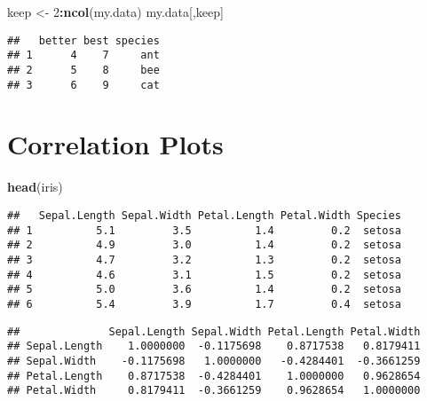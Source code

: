 \documentclass[]{book}
\newenvironment{Shaded}{\begin{snugshade}}{\end{snugshade}}
\newcommand{\DecValTok}[1]{\textcolor[rgb]{0.00,0.00,0.81}{#1}}
\newcommand{\KeywordTok}[1]{\textcolor[rgb]{0.13,0.29,0.53}{\textbf{#1}}}
\newcommand{\NormalTok}[1]{#1}
\newcommand{\OperatorTok}[1]{\textcolor[rgb]{0.81,0.36,0.00}{\textbf{#1}}}
\newcommand{\StringTok}[1]{\textcolor[rgb]{0.31,0.60,0.02}{#1}}
\begin{document}
\begin{Shaded}
\begin{Highlighting}[]
\NormalTok{keep <-}\StringTok{ }\DecValTok{2}\OperatorTok{:}\KeywordTok{ncol}\NormalTok{(my.data)}
\NormalTok{my.data[,keep]}
\end{Highlighting}
\end{Shaded}

\begin{verbatim}
##   better best species
## 1      4    7     ant
## 2      5    8     bee
## 3      6    9     cat
\end{verbatim}

\hypertarget{correlation-plots}{%
\chapter{Correlation Plots}\label{correlation-plots}}

\begin{Shaded}
\begin{Highlighting}[]
\KeywordTok{head}\NormalTok{(iris)}
\end{Highlighting}
\end{Shaded}

\begin{verbatim}
##   Sepal.Length Sepal.Width Petal.Length Petal.Width Species
## 1          5.1         3.5          1.4         0.2  setosa
## 2          4.9         3.0          1.4         0.2  setosa
## 3          4.7         3.2          1.3         0.2  setosa
## 4          4.6         3.1          1.5         0.2  setosa
## 5          5.0         3.6          1.4         0.2  setosa
## 6          5.4         3.9          1.7         0.4  setosa
\end{verbatim}

\begin{Shaded}
\end{Shaded}

\begin{verbatim}
##              Sepal.Length Sepal.Width Petal.Length Petal.Width
## Sepal.Length    1.0000000  -0.1175698    0.8717538   0.8179411
## Sepal.Width    -0.1175698   1.0000000   -0.4284401  -0.3661259
## Petal.Length    0.8717538  -0.4284401    1.0000000   0.9628654
## Petal.Width     0.8179411  -0.3661259    0.9628654   1.0000000
\end{verbatim}
\end{document}

